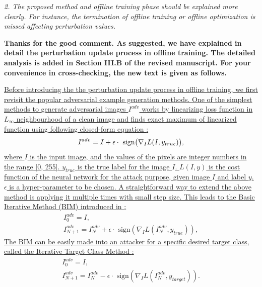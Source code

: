 \documentclass[12pt]{article}
\begin{document}
\textit{2. The proposed method and offline training phase should be explained more clearly. For instance, the termination of offline training or offline optimization is missed affecting perturbation values.}

\textbf{Thanks for the good comment. As suggested, we have explained in detail the perturbation update process in offline training.
The detailed analysis is added in Section III.B of the revised manuscript.
For your convenience in cross-checking, the new text is given as follows.}

\uline{Before introducing the the perturbation update process in offline training, we first revisit the popular adversarial example generation methods. One of the simplest methods to generate adversarial images $I^{adv}$ works by linearizing loss function in $L_{\infty}$ neighbourhood of a clean image and finds exact maximum of linearized function using following closed-form equation \cite{FGSM}:}
\begin{equation}
    I^{adv} = I + \epsilon \cdot \text{ sign} \bigl( \nabla_I L(I, y_{true})  \bigr),
    \vspace{-0.1cm}
\end{equation}
\uline{where $I$ is the input image, and the values of the pixels are integer numbers in the range [0, 255]. $y_{true}$ is the true label for the image $I$. $L(I, y)$ is the cost function of the neural network for the attack purpose, given image $I$ and label $y$. $\epsilon$ is a hyper-parameter to be chosen. A straightforward way to extend the above method is applying it multiple times with small step size. This leads to the Basic Iterative Method (BIM) introduced in \cite{kurakin2017adversarial}:}
\begin{equation}
    \begin{gathered}
        I_0^{adv} = I, \\
        I_{N+1}^{adv} = I_N^{adv}+\epsilon \cdot \text{ sign}(\nabla_I L(I_N^{adv},y_{true})),
    \end{gathered}
\end{equation}
\uline{The BIM can be easily made into an attacker for a specific desired target class, called the Iterative Target Class Method \cite{kurakin2017adversarial}:}
\begin{equation}
  \begin{gathered}
      I_0^{adv} = I,\\
      I_{N+1}^{adv} = I_N^{adv}-\epsilon \cdot \text{ sign}(\nabla_I L(I_N^{adv},y_{target})).
  \end{gathered}
  \label{equ:itcm}
\end{equation}
\end{document}
